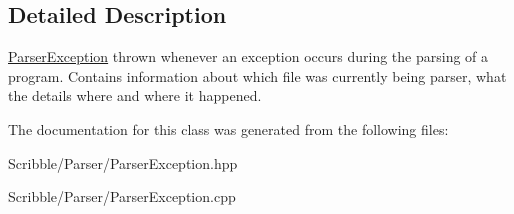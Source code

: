 \subsection{Detailed Description}
\hyperlink{class_parser_exception}{Parser\-Exception} thrown whenever an exception occurs during the parsing of a program. Contains information about which file was currently being parser, what the details where and where it happened. 

The documentation for this class was generated from the following files\-:\begin{DoxyCompactItemize}
\item 
Scribble/\-Parser/Parser\-Exception.\-hpp\item 
Scribble/\-Parser/Parser\-Exception.\-cpp\end{DoxyCompactItemize}
